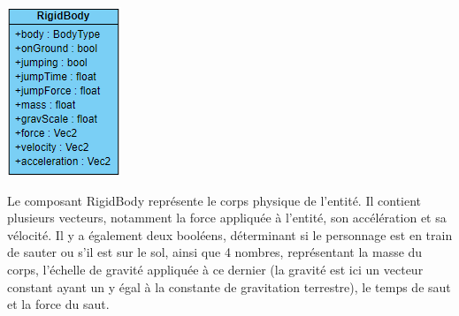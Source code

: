 \documentclass[12pt, openany]{report}
\begin{document}
\begin{minipage}{.35\textwidth}
\includegraphics[width=\textwidth]{rigidbody.png}
\end{minipage}
\hfill
\begin{minipage}{.6\textwidth}
Le composant RigidBody repr\'esente le corps physique de l'entit\'e. Il contient plusieurs vecteurs, notamment la force appliqu\'ee \`a l'entit\'e, son acc\'el\'eration et sa v\'elocit\'e. Il y a \'egalement deux bool\'eens, d\'eterminant si le personnage est en train de sauter ou s'il est sur le sol, ainsi que 4 nombres, repr\'esentant la masse du corps, l'\'echelle de gravit\'e appliqu\'ee \`a ce dernier (la gravit\'e est ici un vecteur constant ayant un y \'egal \`a la constante de gravitation terrestre), le temps de saut et la force du saut.
\end{minipage}
\end{document}
